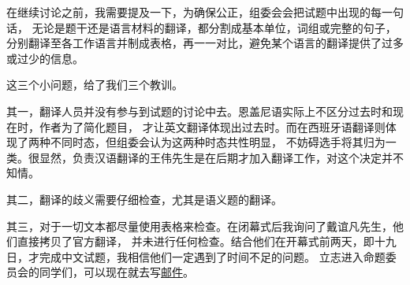 \documentclass[11pt]{article}
\begin{document}
在继续讨论之前，我需要提及一下，为确保公正，组委会会把试题中出现的每一句话，
无论是题干还是语言材料的翻译，都分割成基本单位，词组或完整的句子，
分别翻译至各工作语言并制成表格，再一一对比，避免某个语言的翻译提供了过多或过少的信息\cite{IOLEdit}。

这三个小问题，给了我们三个教训。

其一，翻译人员并没有参与到试题的讨论中去。恩盖尼语实际上不区分过去时和现在时，作者为了简化题目，
才让英文翻译体现出过去时。而在西班牙语翻译则体现了两种不同时态，但组委会认为这两种时态共性明显，
不妨碍选手将其归为一类。很显然，负责汉语翻译的王伟先生是在后期才加入翻译工作，对这个决定并不知情。

其二，翻译的歧义需要仔细检查，尤其是语义题的翻译。

其三，对于一切文本都尽量使用表格来检查。在闭幕式后我询问了戴谊凡先生，他们直接拷贝了官方翻译，
并未进行任何检查。结合他们在开幕式前两天，即十九日，才完成中文试题，我相信他们一定遇到了时间不足的问题。
立志进入命题委员会的同学们，可以现在就去写\href{mailto:pc-chair@ioling.org}{邮件}。











\renewcommand \refname{引用}

\end{document}
